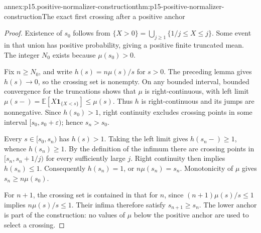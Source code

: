 \begin{annexitem}{annex:p15.positive-normalizer-construction}{thm:p15-positive-normalizer-construction}{The exact first crossing after a positive anchor}
\begin{proof}
Existence of \(s_0\) follows from
\(\{X>0\}=\bigcup_{j\geq1}\{1/j\leq X\leq j\}\).
Some event in that union has positive probability, giving a
positive finite truncated mean. The integer \(N_0\) exists
because \(\mu(s_0)>0\).

Fix \(n\geq N_0\), and write \(h(s)=n\mu(s)/s\) for \(s>0\).
The preceding lemma gives \(h(s)\to0\), so the crossing set is
nonempty. On any bounded interval, bounded convergence for the
truncations shows that \(\mu\) is right-continuous, with left
limit \(\mu(s-)=\mathbb E[X\mathbf1_{\{X<s\}}]\leq\mu(s)\).
Thus \(h\) is right-continuous and its jumps are nonnegative.
Since \(h(s_0)>1\), right continuity excludes crossing points
in some interval \([s_0,s_0+\varepsilon)\); hence \(s_n>s_0\).

Every \(s\in[s_0,s_n)\) has \(h(s)>1\). Taking the left limit
gives \(h(s_n-)\geq1\), whence \(h(s_n)\geq1\).
By the definition of the infimum there are crossing points
in \([s_n,s_n+1/j)\) for every sufficiently large \(j\).
Right continuity then implies \(h(s_n)\leq1\).
Consequently \(h(s_n)=1\), or \(n\mu(s_n)=s_n\).
Monotonicity of \(\mu\) gives \(s_n\geq n\mu(s_0)\).

For \(n+1\), the crossing set is contained in that for \(n\),
since \((n+1)\mu(s)/s\leq1\) implies \(n\mu(s)/s\leq1\).
Their infima therefore satisfy \(s_{n+1}\geq s_n\).
The lower anchor is part of the construction: no values of
\(\mu\) below the positive anchor are used to select a crossing.
\end{proof}
\end{annexitem}


